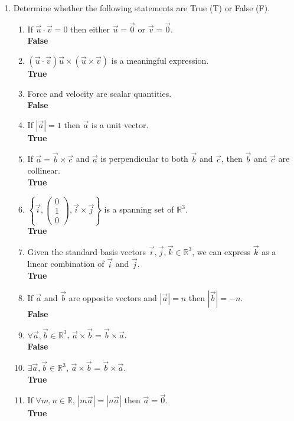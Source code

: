 \documentclass[12pt]{book}
\begin{document}
\begin{enumerate}

\item Determine whether the following statements are True (T) or False (F).

\begin{enumerate}
\item If $\vec{u} \cdot \vec{v} = 0$ then either $\vec{u} = \vec{0}$ or $\vec{v} = \vec{0}$.\\
\textbf{False}
\item $(\vec{u} \cdot \vec{v})\vec{u} \times (\vec{u} \times \vec{v})$ is a meaningful expression.\\
\textbf{True}
\item Force and velocity are scalar quantities.\\
\textbf{False}
\item If $|\vec{a}| = 1$ then $\vec{a}$ is a unit vector.\\
\textbf{True}
\item If $\vec{a} = \vec{b} \times \vec{c}$ and $\vec{a}$ is perpendicular to both $\vec{b}$ and $\vec{c}$, then $\vec{b}$ and $\vec{c}$ are collinear.\\
\textbf{True}
\item $\left\{ \vec{i}, \left(\begin{smallmatrix} 0 \\ 1 \\ 0 \end{smallmatrix}\right), \vec{i} \times \vec{j}\right\}$ is a spanning set of $\mathbb{R}^3$.\\
\textbf{True}
\item Given the standard basis vectors $\vec{i}, \vec{j}, \vec{k} \in \mathbb{R}^3$, we can express $\vec{k}$  as a linear combination of $\vec{i}$ and $\vec{j}$.\\
\textbf{True}
\item If $\vec{a}$ and $\vec{b}$ are opposite vectors and $|\vec{a}| = n$ then $|\vec{b}| = -n$.\\
\textbf{False}
\item $\forall \vec{a}, \vec{b} \in \mathbb{R}^3$, $\vec{a} \times \vec{b} = \vec{b} \times \vec{a}$.\\
\textbf{False}
\item $\exists \vec{a}, \vec{b} \in \mathbb{R}^3$, $\vec{a} \times \vec{b} = \vec{b} \times \vec{a}$.\\
\textbf{True}
\item If $\forall m,n \in \mathbb{R}$, $|m\vec{a}| = |n\vec{a}|$ then $\vec{a}=\vec{0}$.\\
\textbf{True}


\end{enumerate}
\end{enumerate}
\end{document}

